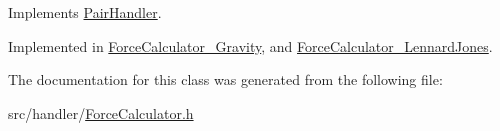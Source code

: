 Implements \hyperlink{classPairHandler_a2811e5957b516f41e1cb52c71af3f6e9}{Pair\-Handler}.



Implemented in \hyperlink{classForceCalculator__Gravity_a8f79c8d0ef3621a646288a195bf2e75a}{Force\-Calculator\-\_\-\-Gravity}, and \hyperlink{classForceCalculator__LennardJones_a153d67ac2a42b1e237c103e5f63b4461}{Force\-Calculator\-\_\-\-Lennard\-Jones}.



The documentation for this class was generated from the following file\-:\begin{DoxyCompactItemize}
\item 
src/handler/\hyperlink{ForceCalculator_8h}{Force\-Calculator.\-h}\end{DoxyCompactItemize}

